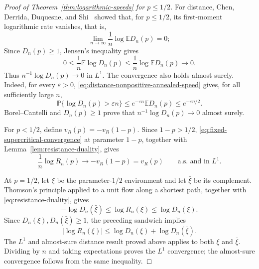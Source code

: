 \documentclass[12pt,preprint]{amsart}
\numberwithin{equation}{section}
\theoremstyle{plain}
\theoremstyle{definition}
\newcommand{\E}{\mathbb E}
\newcommand{\Pp}{\mathbb P}
\begin{document}
\begin{proof}[Proof of Theorem~\ref{thm:logarithmic-speeds}
for $p\le 1/2$]
For distance, Chen, Derrida, Duquesne, and
Shi~\cite{ChenDerridaDuquesneShi2026} showed that, for $p\le1/2$, its
first-moment logarithmic rate vanishes, that is,
\begin{equation}
 \lim_{n\to\infty}\frac1n\log\E D_n(p)=0;
 \label{eq:distance-nonpositive-annealed-speed}
\end{equation}
Since $D_n(p)\ge1$,
Jensen's inequality gives
\[
 0\le \frac1n\E\log D_n(p)
 \le \frac1n\log\E D_n(p)\longrightarrow0.
\]
Thus $n^{-1}\log D_n(p)\to0$ in $L^1$.
The convergence also holds almost surely.  Indeed, for every
$\varepsilon>0$,
\eqref{eq:distance-nonpositive-annealed-speed} gives, for all sufficiently
large $n$,
\[
 \Pp\{\log D_n(p)>\varepsilon n\}
 \le e^{-\varepsilon n}\E D_n(p)
 \le e^{-\varepsilon n/2}.
\]
Borel--Cantelli and $D_n(p)\ge1$ prove that
$n^{-1}\log D_n(p)\to0$ almost surely.

For $p<1/2$, define $v_R(p)=-v_R(1-p)$.  Since $1-p>1/2$,
\eqref{eq:fixed-supercritical-convergence} at parameter $1-p$,
together with Lemma~\ref{lem:resistance-duality}, gives
\[
 \frac1n\log R_n(p)\longrightarrow-v_R(1-p)=v_R(p)
\qquad\text{a.s. and in }L^1.
\]

At $p=1/2$, let $\xi$ be the parameter-$1/2$ environment and let $\bar\xi$ be its
complement.  Thomson's principle applied to a unit flow along a shortest path,
together with \eqref{eq:resistance-duality}, gives
\[
 -\log D_n(\bar\xi)
 \le \log R_n(\xi)
 \le \log D_n(\xi).
\]
Since $D_n(\xi),D_n(\bar\xi)\ge1$, the preceding sandwich implies
\[
 |\log R_n(\xi)|
 \le \log D_n(\xi)+\log D_n(\bar\xi).
\]
The $L^1$ and almost-sure distance result proved above applies to both $\xi$
and $\bar\xi$.  Dividing by $n$ and taking expectations proves the $L^1$
convergence; the almost-sure convergence follows from the same inequality.
\end{proof}
\end{document}
